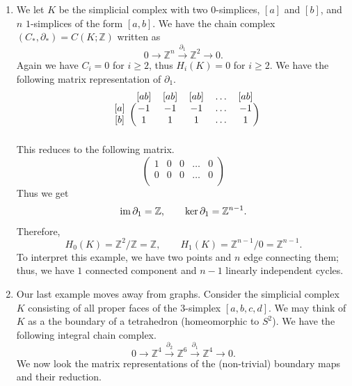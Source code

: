 \begin{example}
\begin{enumerate}
        \item We let $K$ be the simplicial complex with two $0$-simplices, $[a]$ and $[b]$, and $n$ $1$-simplices of the form $[a,b]$. We have the chain complex $(C_*, \partial_*) = C(K; \mathbb Z)$ written as
              \[ 0 \to \mathbb Z^n \xrightarrow{\partial_1} \mathbb Z^2 \to 0. \]
              Again we have $C_i = 0$ for $i \geq 2$, thus $H_i(K) = 0$ for $i \geq 2$. We have the following matrix representation of $\partial_1$.
              \[
                  \begin{blockarray}{cccccc}
                      & [ab] & [ab] & [ab] & \ldots & [ab] \\
                      \begin{block}{c(ccccc)}
                          {[a]} & -1 & -1 & -1 & \ldots & -1 \\
                          {[b]} & 1  & 1  & 1  & \ldots & 1\\
                      \end{block}
                  \end{blockarray}
              \]
              This reduces to the following matrix.
              \[
                  \begin{pmatrix}
                      1 & 0 & 0 & \ldots & 0 \\
                      0 & 0 & 0 & \ldots & 0 \\
                  \end{pmatrix}
              \]
              Thus we get
              \[ \operatorname{im}\partial_1 = \mathbb Z, \qquad \ker\partial_1 = \mathbb Z^{n-1}. \]
              Therefore,
              \[ H_0(K) = \mathbb Z^2 / \mathbb Z = \mathbb Z, \qquad
                  H_1(K) = \mathbb Z^{n-1} / 0 = \mathbb Z^{n-1}. \]
              To interpret this example, we have two points and $n$ edge connecting them; thus, we have $1$ connected component and $n-1$ linearly independent cycles.
        \item Our last example moves away from graphs. Consider the simplicial complex $K$ consisting of all proper faces of the $3$-simplex $[a,b,c,d]$.
              We may think of $K$ as a the boundary of a tetrahedron (homeomorphic to $S^2$). We have the following integral chain complex.
              \[ 0 \to \mathbb Z^4 \xrightarrow{\partial_2} \mathbb Z^6 \xrightarrow{\partial_1} \mathbb Z^4 \to 0. \]
              We now look the matrix representations of the (non-trivial) boundary maps and their reduction.
                  {\small
                      \begin{align*}

\end{align*}}
\end{enumerate}
\end{example}
